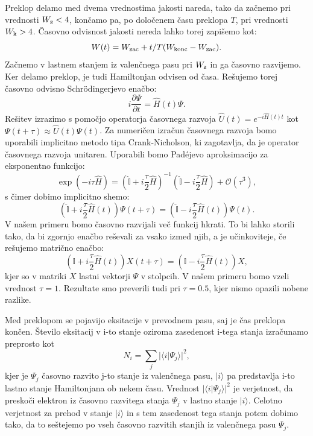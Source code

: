 Preklop delamo med dvema vrednostima jakosti nareda, tako da začnemo pri vrednosti $W_{\textup{z}}<4$, končamo pa, po določenem času preklopa $T$, pri vrednosti $W_{\textup{k}}>4$.
Časovno odvisnost jakosti nereda lahko torej zapišemo kot: 
\begin{equation}
W(t) = W_{\textup{zac}} +  t/T (W_{\textup{konc}}-W_{\textup{zac}}).
\end{equation} 
Začnemo v lastnem stanjem iz valenčnega pasu pri $W_{\textup{z}}$ in ga časovno razvijemo. Ker delamo preklop, je tudi Hamiltonjan odvisen od časa.
Rešujemo torej časovno odvisno Schrödingerjevo enačbo:
\begin{equation}
i \frac{\partial \Psi}{\partial t} = \hat{H}(t) \Psi.
\end{equation}
Rešitev izrazimo s pomočjo operatorja časovnega razvoja $\hat{U}(t) = e^{-i \hat{H}(t) t}$ kot $\Psi(t+\tau) \approx \hat{U}(t) \Psi(t)$.
Za numeričen izračun časovnega razvoja bomo uporabili implicitno metodo tipa Crank-Nicholson, ki zagotavlja, da je operator časovnega razvoja unitaren.
Uporabili bomo Padéjevo aproksimacijo za eksponentno funkcijo:
\begin{equation}
\exp (-i \tau \hat{H}) = \left(\hat{\mathbb{I}} + i \frac{\tau}{2} \hat{H} \right)^{-1}   \left(\hat{\mathbb{I}} - i \frac{\tau}{2} \hat{H} \right) + \mathcal{O}(\tau^3),
\end{equation} 
s čimer dobimo implicitno shemo:
\begin{equation}
\left( \hat{\mathbb{I}} + i \frac{\tau}{2} \hat{H}(t) \right) \Psi (t+\tau) = \left(\hat{\mathbb{I}}- i \frac{\tau}{2} \hat{H}(t) \right) \Psi(t).
\end{equation}
V našem primeru bomo časovno razvijali več funkcij hkrati. To bi lahko storili tako, da bi zgornjo enačbo reševali za vsako izmed njih, a je učinkoviteje, če rešujemo matrično enačbo:
\begin{equation}
\left( \mathbb{I} + i \frac{\tau}{2} \hat{H}(t) \right) X(t+\tau) = \left(\mathbb{I}- i \frac{\tau}{2} \hat{H}(t) \right) X,
\end{equation}
kjer so v matriki $X$ lastni vektorji $\Psi$ v stolpcih.
V našem primeru bomo vzeli vrednost $\tau=1$. Rezultate smo preverili tudi pri $\tau=0.5$, kjer nismo opazili nobene razlike.

Med preklopom se pojavijo eksitacije v prevodnem pasu, saj je čas preklopa končen.
Število eksitacij v i-to stanje oziroma zasedenost i-tega stanja izračunamo preprosto kot
\begin{equation}
N_i = \sum_j |\langle i | \Psi_j \rangle|^2,
\end{equation}
kjer je $\Psi_j$ časovno razvito j-to stanje iz valenčnega pasu, $| i \rangle$ pa predstavlja i-to lastno stanje Hamiltonjana ob nekem času. Vrednost $| \langle i | \Psi_j \rangle |^2$ je verjetnost, da preskoči elektron iz časovno razvitega stanja $\Psi_j$ v lastno stanje $| i \rangle$. Celotno verjetnost za prehod v stanje $| i \rangle$ in s tem zasedenost tega stanja potem dobimo tako, da to seštejemo po vseh časovno razvitih stanjih iz valenčnega pasu $\Psi_j$.

